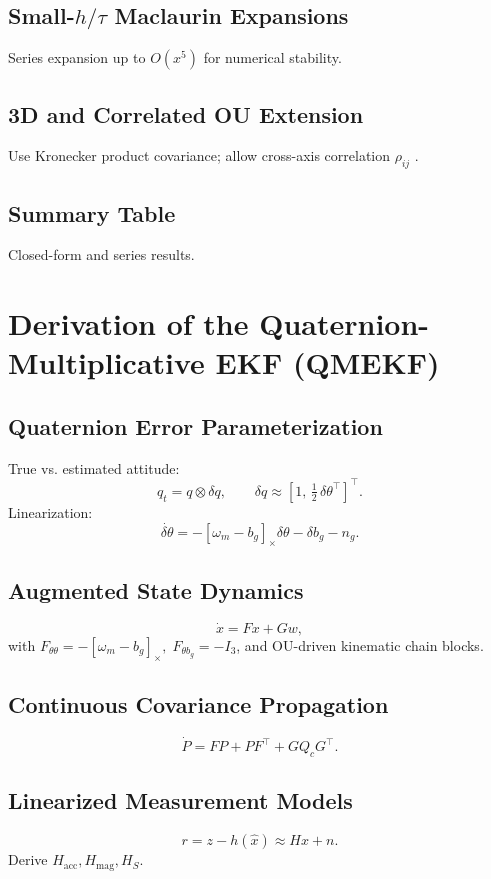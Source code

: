 \documentclass[10pt]{extarticle}
\begin{document}
\subsection{Small-$h/\tau$ Maclaurin Expansions}
Series expansion up to $O(x^5)$ for numerical stability.

\subsection{3D and Correlated OU Extension}
Use Kronecker product covariance; allow cross-axis correlation $\rho_{ij}$
\cite{brown2012}.

\subsection{Summary Table}
Closed-form and series results.

\section{Derivation of the Quaternion-Multiplicative EKF (QMEKF)}
\label{sec:qmekf}

\subsection{Quaternion Error Parameterization}
True vs. estimated attitude:
\[
q_t = q\otimes\delta q,\qquad
\delta q \approx [1,\,\tfrac12\,\delta\theta^\top]^\top.
\]
Linearization:
\[
\dot{\delta\theta} = -[\omega_m - b_g]_\times\delta\theta - \delta b_g - n_g.
\]
\cite{shuster1993,crassidis2012}

\subsection{Augmented State Dynamics}
\[
\dot x = F x + G w,
\]
with $F_{\theta\theta}=-[\omega_m-b_g]_\times,\;F_{\theta b_g}=-I_3$, and OU-driven kinematic chain blocks.

\subsection{Continuous Covariance Propagation}
\[
\dot P = F P + P F^\top + G Q_c G^\top.
\]

\subsection{Linearized Measurement Models}
\[
r = z - h(\hat x) \approx H x + n.
\]
Derive $H_\text{acc},H_\text{mag},H_S$.
\end{document}

